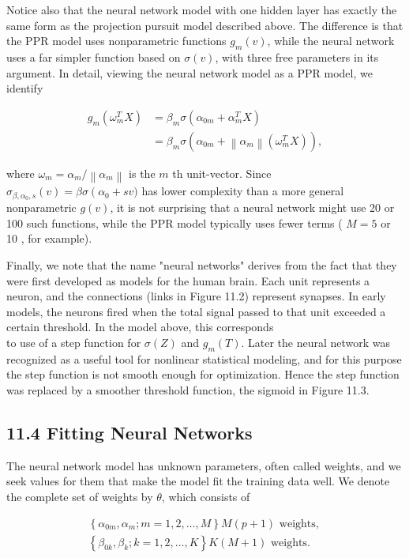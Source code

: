 \documentclass[10pt]{article}
\begin{document}
Notice also that the neural network model with one hidden layer has exactly the same form as the projection pursuit model described above. The difference is that the PPR model uses nonparametric functions $g_{m}(v)$, while the neural network uses a far simpler function based on $\sigma(v)$, with three free parameters in its argument. In detail, viewing the neural network model as a PPR model, we identify


\begin{align*}
g_{m}\left(\omega_{m}^{T} X\right) & =\beta_{m} \sigma\left(\alpha_{0 m}+\alpha_{m}^{T} X\right) \\
& =\beta_{m} \sigma\left(\alpha_{0 m}+\left\|\alpha_{m}\right\|\left(\omega_{m}^{T} X\right)\right), \tag{11.7}
\end{align*}


where $\omega_{m}=\alpha_{m} /\left\|\alpha_{m}\right\|$ is the $m$ th unit-vector. Since $\sigma_{\beta, \alpha_{0}, s}(v)=\beta \sigma\left(\alpha_{0}+\right. s v)$ has lower complexity than a more general nonparametric $g(v)$, it is not surprising that a neural network might use 20 or 100 such functions, while the PPR model typically uses fewer terms ( $M=5$ or 10 , for example).

Finally, we note that the name "neural networks" derives from the fact that they were first developed as models for the human brain. Each unit represents a neuron, and the connections (links in Figure 11.2) represent synapses. In early models, the neurons fired when the total signal passed to that unit exceeded a certain threshold. In the model above, this corresponds\\
to use of a step function for $\sigma(Z)$ and $g_{m}(T)$. Later the neural network was recognized as a useful tool for nonlinear statistical modeling, and for this purpose the step function is not smooth enough for optimization. Hence the step function was replaced by a smoother threshold function, the sigmoid in Figure 11.3.

\subsection*{11.4 Fitting Neural Networks}
The neural network model has unknown parameters, often called weights, and we seek values for them that make the model fit the training data well. We denote the complete set of weights by $\theta$, which consists of

\[
\begin{array}{r}
\left\{\alpha_{0 m}, \alpha_{m} ; m=1,2, \ldots, M\right\} M(p+1) \text { weights, } \\
\left\{\beta_{0 k}, \beta_{k} ; k=1,2, \ldots, K\right\} K(M+1) \text { weights. } \tag{11.8}
\end{array}
\]
\end{document}
